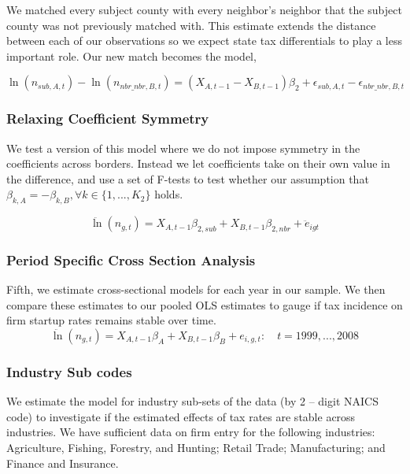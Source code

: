 We matched every subject county with every neighbor's neighbor that the subject county was not previously matched with. This estimate extends the distance between each of our observations so we expect state tax differentials to play a less important role. Our new match becomes the model,

\begin{equation}
\ln(n_{sub,A,t})-\ln(n_{nbr\_nbr,B,t}) = (X_{A,t-1}-X_{B,t-1})\beta_{2} + \epsilon_{sub,A,t}-\epsilon_{nbr\_nbr,B,t}
\end{equation}

\subsubsection{Relaxing Coefficient Symmetry}
We test a version of this model where we do not impose symmetry in the coefficients across borders. Instead we let coefficients take on their own value in the difference, and use a set of F-tests to test whether our assumption that $\beta_{k,A} = - \beta_{k,B}, \forall k \in \{1,...,K_{2}\}$ holds. 

\begin{equation}\label{sense1}
\ddot \ln(n_{g,t}) = X_{A,t-1}\beta_{2,sub}+X_{B,t-1}\beta_{2,nbr}+ \ddot e_{igt} 
\end{equation}

\subsubsection{Period Specific Cross Section Analysis}
Fifth, we estimate cross-sectional models for each year in our sample. We then compare these estimates to our pooled OLS estimates to gauge if tax incidence on firm startup rates remains stable over time.
\begin{equation}\label{sense2}
\ddot \ln(n_{g,t})  = X_{A,t-1}\beta_{A}+X_{B,t-1}\beta_{B}+ e_{i,g,t}: \quad t = 1999,...,2008
\end{equation}


\subsubsection{Industry Sub codes}

We estimate the model for industry sub-sets of the data (by 2 – digit NAICS code) to investigate if the estimated effects of tax rates are stable across industries.  We have sufficient data on firm entry for the following industries: Agriculture, Fishing, Forestry, and Hunting; Retail Trade; Manufacturing; and Finance and Insurance.

